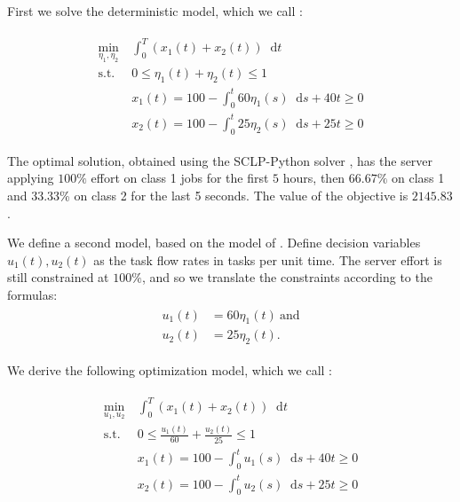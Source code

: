 \documentclass[11pt,a4paper,titlepage]{article}
\newcommand*{\dd}{\ensuremath{\mathop{}\!\mathrm{d}}}%
\theoremstyle{definition}
\theoremstyle{plain}
\begin{document}
First we solve the deterministic model,
which we call \modelone:

\begin{align}
\label{eq:model-1}
\begin{split}
    \min\limits_{\eta_1, \eta_2}
        &~ \int_0^T \left( x_1(t) + x_2(t) \right) \dd t \\
    \text{s.t.}
        &~ 0 \leq \eta_1(t) + \eta_2(t) \leq 1 \\
        &~ x_1(t) = 100 - \int_0^t 60 \eta_1(s) \dd s + 40t \geq 0 \\
        &~ x_2(t) = 100 - \int_0^t 25 \eta_2(s) \dd s + 25t \geq 0
\end{split}
\end{align}

The optimal solution,
obtained using the SCLP-Python solver \autocite{Shindin_SCLPPython_2021},
has the server applying $100\%$ effort on class 1 jobs for the first $5$ hours,
then $66.67\%$ on class 1 and 33.33\% on class 2 for the last 5 seconds.
The value of the objective is $2145.83$.

We define a second model,
based on the model of \autocite{bertsimas2014robust}.
Define  decision variables $u_1(t), u_2(t)$ as the task flow rates
in tasks per unit time.
The server effort is still constrained at $100\%$,
and so we translate the constraints according to the formulas:
\begin{align}
\label{eq:model-2-translation}
\begin{split}
    u_1(t) & = 60 \eta_1(t) ~ \text{and} \\
    u_2(t) & = 25 \eta_2(t).
\end{split}
\end{align}

We derive the following optimization model,
which we call \modeltwo:

\begin{align}
\label{eq:model-2}
\begin{split}
    \min\limits_{u_1, u_2}
        &~ \int_0^T \left( x_1(t) + x_2(t) \right) \dd t \\
    \text{s.t.}
        &~ 0 \leq \frac{u_1(t)}{60} + \frac{u_2(t)}{25} \leq 1 \\
        &~ x_1(t) = 100 - \int_0^t u_1(s) \dd s + 40t \geq 0 \\
        &~ x_2(t) = 100 - \int_0^t u_2(s) \dd s + 25t \geq 0
\end{split}
\end{align}
\end{document}
